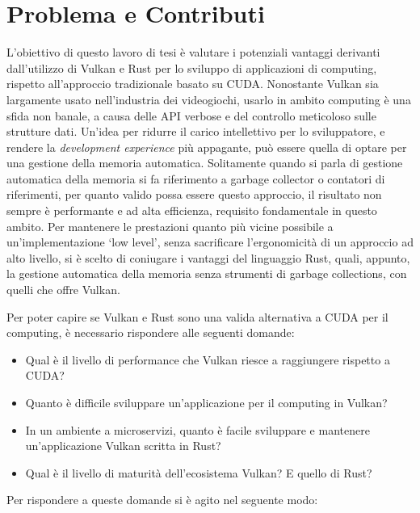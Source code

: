 \section[Problema e Contributi]{Problema e Contributi}

L'obiettivo di questo lavoro di tesi è valutare i potenziali vantaggi derivanti dall'utilizzo di Vulkan e Rust per lo sviluppo di applicazioni di computing, rispetto all'approccio tradizionale basato su CUDA.
Nonostante Vulkan sia largamente usato nell'industria dei videogiochi, usarlo in ambito computing è una sfida non banale, a causa delle API verbose e del controllo meticoloso sulle strutture dati. 
Un'idea per ridurre il carico intellettivo per lo sviluppatore, e rendere la \textit{development experience} più appagante, può essere quella di optare per una gestione della memoria automatica. Solitamente quando si parla di gestione automatica della memoria si fa riferimento a garbage collector o contatori di riferimenti, per quanto valido possa essere questo approccio, il risultato non sempre è performante e ad alta efficienza, requisito fondamentale in questo ambito. Per mantenere le prestazioni quanto più vicine possibile a un'implementazione `low level', senza sacrificare l'ergonomicità di un approccio ad alto livello, si è scelto di coniugare i vantaggi del linguaggio Rust, quali, appunto, la gestione automatica della memoria senza strumenti di garbage collections, con quelli che offre Vulkan. 

Per poter capire se Vulkan e Rust sono una valida alternativa a CUDA per il computing, è necessario rispondere alle seguenti domande:

\begin{itemize}
    \item Qual è il livello di performance che Vulkan riesce a raggiungere rispetto a CUDA? 
    \item Quanto è difficile sviluppare un'applicazione per il computing in Vulkan?
    \item In un ambiente a microservizi, quanto è facile sviluppare e mantenere un'applicazione Vulkan scritta in Rust? 
    \item Qual è il livello di maturità dell'ecosistema Vulkan? E quello di Rust?
\end{itemize}

Per rispondere a queste domande si è agito nel seguente modo:

